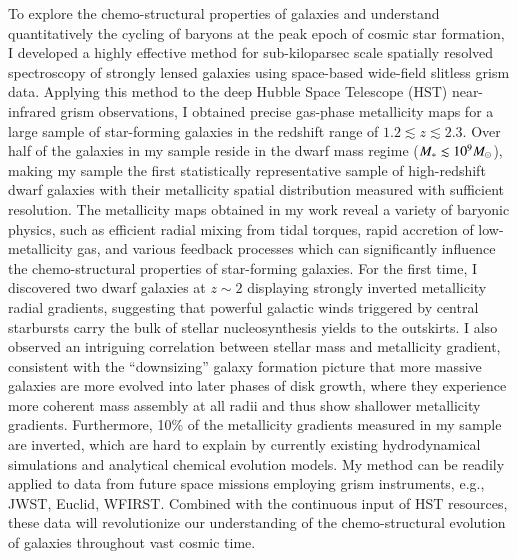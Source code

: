 To explore the chemo-structural properties of galaxies and understand quantitatively the cycling of baryons at
the peak epoch of cosmic star formation, I developed a highly effective method for sub-kiloparsec scale spatially
resolved spectroscopy of strongly lensed galaxies using space-based wide-field slitless grism data.  Applying
this method to the deep Hubble Space Telescope (HST) near-infrared grism observations, I obtained precise
gas-phase metallicity maps for a large sample of star-forming galaxies in the redshift range of $1.2\lesssim
z\lesssim2.3$. Over
half of the galaxies in my sample reside in the dwarf mass regime ($M_\ast\lesssim10^9 M_\odot$), making my sample the first
statistically representative sample of high-redshift dwarf galaxies with their metallicity spatial distribution
measured with sufficient resolution.  The metallicity maps obtained in my work reveal a variety of baryonic
physics, such as efficient radial mixing from tidal torques, rapid accretion of low-metallicity gas, and various
feedback processes which can significantly influence the chemo-structural properties of star-forming galaxies.
For the first time, I discovered two dwarf galaxies at $z\sim2$ displaying strongly inverted metallicity radial
gradients, suggesting that powerful galactic winds triggered by central starbursts carry the bulk of stellar
nucleosynthesis yields to the outskirts.  I also observed an intriguing correlation between stellar mass and
metallicity gradient, consistent with the ``downsizing'' galaxy formation picture that more massive galaxies are
more evolved into later phases of disk growth, where they experience more coherent mass assembly at all radii
and thus show shallower metallicity gradients.  Furthermore, 10\% of the metallicity gradients measured in my
sample are inverted, which are hard to explain by currently existing hydrodynamical simulations and analytical
chemical evolution models.  My method can be readily applied to data from future space missions employing grism
instruments, e.g., JWST, Euclid, WFIRST.  Combined with the continuous input of HST resources, these data will
revolutionize our understanding of the chemo-structural evolution of galaxies throughout vast cosmic time.
